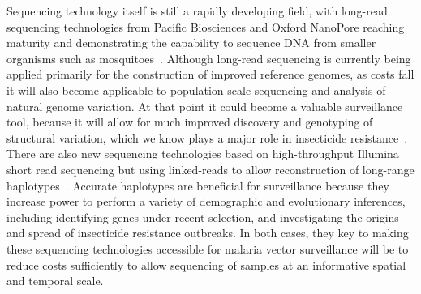 \documentclass[a4paper,11pt,abstracton,hidelinks]{scrartcl}
\begin{document}
Sequencing technology itself is still a rapidly developing field, with long-read sequencing technologies from Pacific Biosciences and Oxford NanoPore reaching maturity and demonstrating the capability to sequence DNA from smaller organisms such as mosquitoes~\parencite{Kingan2019,Ghurye2019,Zamyatin2020}.
%
Although long-read sequencing is currently being applied primarily for the construction of improved reference genomes, as costs fall it will also become applicable to population-scale sequencing and analysis of natural genome variation.
%
At that point it could become a valuable surveillance tool, because it will allow for much improved discovery and genotyping of structural variation, which we know plays a major role in insecticide resistance~\parencite{Lucas2019}.
%
There are also new sequencing technologies based on high-throughput Illumina short read sequencing but using linked-reads to allow reconstruction of long-range haplotypes~\parencite{Mostovoy2016}.
%
Accurate haplotypes are beneficial for surveillance because they increase power to perform a variety of demographic and evolutionary inferences, including identifying genes under recent selection, and investigating the origins and spread of insecticide resistance outbreaks.
%
In both cases, they key to making these sequencing technologies accessible for malaria vector surveillance will be to reduce costs sufficiently to allow sequencing of samples at an informative spatial and temporal scale.
\end{document}

